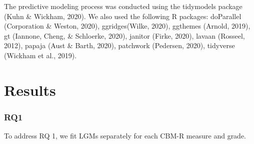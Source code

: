 \documentclass[
  english,
  man, fleqn, noextraspace]{apa6}
\begin{document}
The predictive modeling process was conducted using the tidymodels package (Kuhn \& Wickham, 2020). We also used the following R packages: doParallel (Corporation \& Weston, 2020), ggridges(Wilke, 2020), ggthemes (Arnold, 2019), gt (Iannone, Cheng, \& Schloerke, 2020), janitor (Firke, 2020), lavaan (Rosseel, 2012), papaja (Aust \& Barth, 2020), patchwork (Pedersen, 2020), tidyverse (Wickham et al., 2019).

\hypertarget{results}{%
\section{Results}\label{results}}

\hypertarget{rq1}{%
\subsubsection{RQ1}\label{rq1}}

To address RQ 1, we fit LGMs separately for each CBM-R measure and grade.
\end{document}
